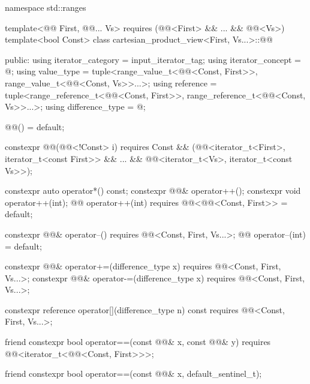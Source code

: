 %
\begin{codeblock}
namespace std::ranges {
  template<@@ First, @@... Vs>
    requires (@@<First> && ... && @@<Vs>)
  template<bool Const>
  class cartesian_product_view<First, Vs...>::@@ {
  public:
    using iterator_category = input_iterator_tag;
    using iterator_concept  = @\seebelow@;
    using value_type = tuple<range_value_t<@@<Const, First>>,
      range_value_t<@@<Const, Vs>>...>;
    using reference = tuple<range_reference_t<@@<Const, First>>,
      range_reference_t<@@<Const, Vs>>...>;
    using difference_type = @\seebelow@;

    @@() = default;

    constexpr @@(@@<!Const> i) requires Const &&
      (@@<iterator_t<First>, iterator_t<const First>> &&
        ... && @@<iterator_t<Vs>, iterator_t<const Vs>>);

    constexpr auto operator*() const;
    constexpr @@& operator++();
    constexpr void operator++(int);
    @@ operator++(int) requires @@<@@<Const, First>> = default;

    constexpr @@& operator--()
      requires @@<Const, First, Vs...>;
    @@ operator--(int) = default;

    constexpr @@& operator+=(difference_type x)
      requires @@<Const, First, Vs...>;
    constexpr @@& operator-=(difference_type x)
      requires @@<Const, First, Vs...>;

    constexpr reference operator[](difference_type n) const
      requires @@<Const, First, Vs...>;

    friend constexpr bool operator==(const @@& x, const @@& y)
      requires @@<iterator_t<@@<Const, First>>>;

    friend constexpr bool operator==(const @@& x, default_sentinel_t);

}}
\end{codeblock}
